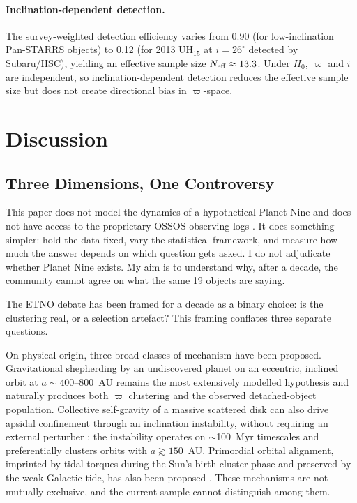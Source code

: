 \documentclass{aa}
\begin{document}
\paragraph{Inclination-dependent detection.}
The survey-weighted detection efficiency varies from 0.90 (for low-inclination Pan-STARRS objects) to 0.12 (for 2013 UH$_{15}$ at $i=26^\circ$ detected by Subaru/HSC), yielding an effective sample size $N_{\rm eff}\approx13.3$. Under $H_0$, $\varpi$ and $i$ are independent, so inclination-dependent detection reduces the effective sample size but does not create directional bias in $\varpi$-space.

\section{Discussion}

\subsection{Three Dimensions, One Controversy}

This paper does not model the dynamics of a hypothetical Planet Nine \citep{batygin2016,brown2019} and does not have access to the proprietary OSSOS observing logs \citep{shankman2017,napier2021}. It does something simpler: hold the data fixed, vary the statistical framework, and measure how much the answer depends on which question gets asked. I do not adjudicate whether Planet Nine exists. My aim is to understand why, after a decade, the community cannot agree on what the same 19 objects are saying.

The ETNO debate has been framed for a decade as a binary choice: is the clustering real, or a selection artefact? This framing conflates three separate questions.

On physical origin, three broad classes of mechanism have been proposed. Gravitational shepherding by an undiscovered planet on an eccentric, inclined orbit at $a\sim400$--800~AU \citep{batygin2016,brown2019,batygin2019,siraj2025} remains the most extensively modelled hypothesis and naturally produces both $\varpi$ clustering and the observed detached-object population. Collective self-gravity of a massive scattered disk can also drive apsidal confinement through an inclination instability, without requiring an external perturber \citep{madigan2018,zderic2020}; the instability operates on $\sim$100~Myr timescales and preferentially clusters orbits with $a\gtrsim150$~AU. Primordial orbital alignment, imprinted by tidal torques during the Sun's birth cluster phase and preserved by the weak Galactic tide, has also been proposed \citep{trujillo2014}. These mechanisms are not mutually exclusive, and the current sample cannot distinguish among them.
\end{document}
